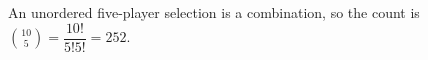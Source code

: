 An unordered five-player selection is a combination, so the count is $\binom{10}{5}=\dfrac{10!}{5!5!}=\boxed{252}$.
